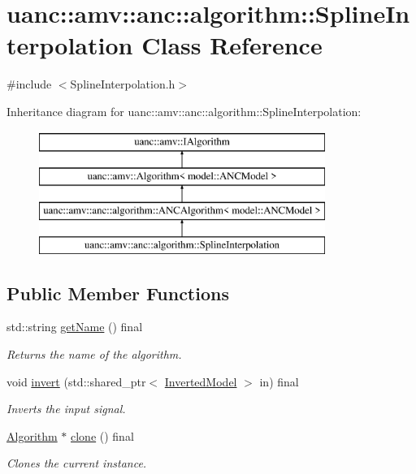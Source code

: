 \hypertarget{classuanc_1_1amv_1_1anc_1_1algorithm_1_1_spline_interpolation}{}\section{uanc\+:\+:amv\+:\+:anc\+:\+:algorithm\+:\+:Spline\+Interpolation Class Reference}
\label{classuanc_1_1amv_1_1anc_1_1algorithm_1_1_spline_interpolation}


{\ttfamily \#include $<$Spline\+Interpolation.\+h$>$}

Inheritance diagram for uanc\+:\+:amv\+:\+:anc\+:\+:algorithm\+:\+:Spline\+Interpolation\+:\begin{figure}[H]
\begin{center}
\leavevmode
\includegraphics[height=4.000000cm]{classuanc_1_1amv_1_1anc_1_1algorithm_1_1_spline_interpolation}
\end{center}
\end{figure}
\subsection*{Public Member Functions}
\begin{DoxyCompactItemize}
\item 
std\+::string \hyperlink{classuanc_1_1amv_1_1anc_1_1algorithm_1_1_spline_interpolation_a1a26a15fbebb957e8a9b404a19ed41fb}{get\+Name} () final
\begin{DoxyCompactList}\small\item\em Returns the name of the algorithm. \end{DoxyCompactList}\item 
void \hyperlink{classuanc_1_1amv_1_1anc_1_1algorithm_1_1_spline_interpolation_a60dcdd5acbba6fee64cf228485b81523}{invert} (std\+::shared\+\_\+ptr$<$ \hyperlink{classuanc_1_1amv_1_1_inverted_model}{Inverted\+Model} $>$ in) final
\begin{DoxyCompactList}\small\item\em Inverts the input signal. \end{DoxyCompactList}\item 
\hyperlink{classuanc_1_1amv_1_1_algorithm}{Algorithm} $\ast$ \hyperlink{classuanc_1_1amv_1_1anc_1_1algorithm_1_1_spline_interpolation_a43063277ff720c71b932ee29673b568f}{clone} () final
\begin{DoxyCompactList}\small\item\em Clones the current instance. \end{DoxyCompactList}\end{DoxyCompactItemize}
